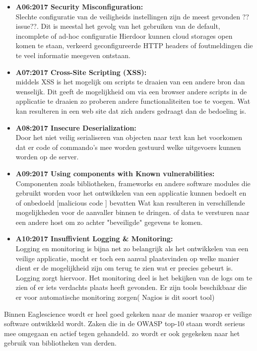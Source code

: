 \begin{itemize}
\item \textbf{A06:2017 Security Misconfiguration:}\\
Slechte configuratie van de veiligheids instellingen zijn de meest gevonden ??issue??. Dit is meestal het gevolg van het gebruiken van de default, incomplete of ad-hoc configuratie Hierdoor kunnen cloud storages open komen te staan, verkeerd geconfigureerde HTTP headers of foutmeldingen die te veel informatie meegeven ontstaan.

\item \textbf{A07:2017 Cross-Site Scripting (XSS):}\\ middels XSS is het mogelijk om scripts te draaien van een andere bron dan wenselijk. Dit geeft de mogelijkheid om via een browser andere scripts in de applicatie te draaien zo proberen andere functionaliteiten toe te voegen. Wat kan resulteren in een web site dat zich anders gedraagt dan de bedoeling is.

\item \textbf{A08:2017 Insecure Deserialization:}\\ Door het niet veilig serialiseren van objecten naar text kan het voorkomen dat er code of commando's mee worden gestuurd welke uitgevoers kunnen worden op de server.

\item \textbf{A09:2017 Using components with Known vulnerabilities:}\\
Componenten zoals bibliotheken, frameworks en andere software modules die gebruikt worden voor het ontwikkelen van een applicatie kunnen bedoelt en of onbedoeld [malicious code ] bevatten Wat kan resulteren in verschillende mogelijkheden voor de aanvaller binnen te dringen. of data te versturen naar een andere host om zo achter "beveiligde" gegevens te komen.


\item \textbf{A10:2017 Insuffivient Logging \& Monitoring:}\\
Logging en monitoring is bijna net zo belangrijk als het ontwikkelen van een veilige applicatie, mocht er toch een aanval plaatsvinden op welke manier dient er de mogelijkheid zijn om terug te zien wat er precies gebeurt is. Logging zorgt hiervoor. Het monitoring deel is het bekijken van de logs om te zien of er iets verdachts plaats heeft gevonden. Er zijn tools beschikbaar die er voor automatische monitoring zorgen( Nagios is dit soort tool)

\end{itemize}
Binnen Eaglescience wordt er heel goed gekeken naar de manier waarop er veilige software ontwikkeld wordt. Zaken die in de OWASP top-10 staan wordt serieus mee omgegaan en actief tegen gehandeld. zo wordt er ook gegekeken naar het gebruik van bibliotheken van derden.

